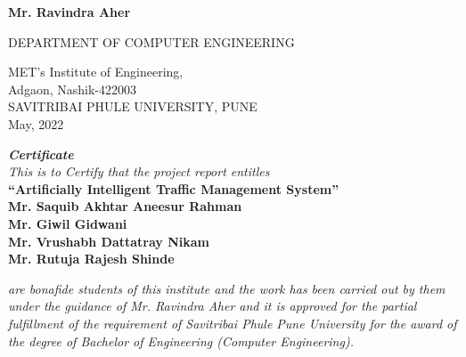 \documentclass[openany,12pt]{report}
\begin{document}
\begin{titlepage}
\begin{center}
			{\bf Mr. Ravindra Aher}\\
			\vspace{0.4in}
			
			
			{\small DEPARTMENT OF COMPUTER ENGINEERING}\\
			\begin{figure}[h]
				\centerline{}
				\label{atcres}
			\end{figure}
			{\large MET's Institute of Engineering,}\\
			{\small Adgaon, Nashik-422003}\\
			SAVITRIBAI PHULE UNIVERSITY, PUNE\\
			\vspace{0.2in}
			{\small May, 2022}
		\end{center}
	\end{titlepage}
	
	\fontsize{14}{16}
	\thispagestyle{empty}
	\begin{center}
		\begin{figure}[h]
			\centerline{}
			\label{atcres}
		\end{figure}
		\vspace{0.1in}
		{\it \Huge  \textbf{Certificate}}
		\vspace{0.2in}\\
		{\it This is to Certify that the project report entitles}\\
		\vspace{0.2in}
		{\Large \bf ``Artificially Intelligent Traffic Management System''}\\
		\vspace{0.2in}
	\fontsize{13}{15}	
		{\bf Mr. Saquib Akhtar Aneesur Rahman}\hspace*{\fill}{\bf (Exam Seat No. B150474298)}\\
		{\bf Mr. Giwil Gidwani}\hspace*{\fill}{\bf (Exam Seat No. B150474245)}\\
		{\bf Mr. Vrushabh Dattatray Nikam}\hspace*{\fill}{\bf (Exam Seat No. B150474278)}\\
		{\bf Mr. Rutuja Rajesh Shinde}\hspace*{\fill}{\bf (Exam Seat No. B150474304)}\\
		
	\end{center}
	\fontsize{14}{16}
	\vspace{0.3in}
	{\it are bonafide students of this institute and the work has been carried out by them under
		the guidance of Mr. Ravindra Aher and it is approved for the partial fulfillment of the
		requirement of Savitribai Phule Pune University for the award of the degree of Bachelor
		of Engineering (Computer Engineering).}\\
	\vspace{0.2in}
	\vspace{0.7in}
	\noindent
	
\end{document}
